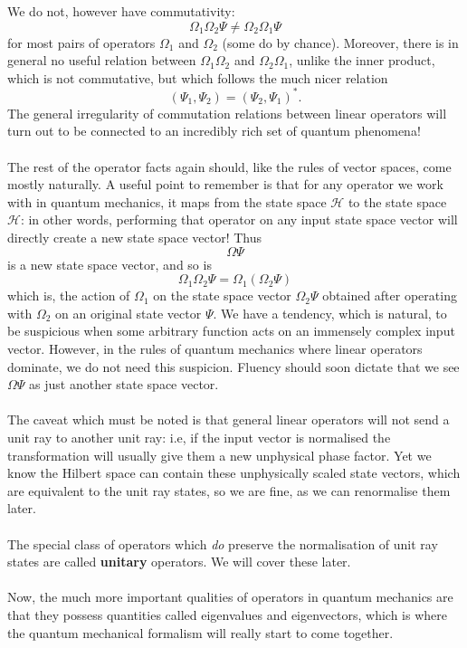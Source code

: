 We do not, however have commutativity:
$$
\Omega_{1}\Omega_{2}\Psi\neq\Omega_{2}\Omega_{1}\Psi
$$
for most pairs of operators $\Omega_{1}$ and $\Omega_{2}$ (some do by chance). Moreover, there is in general no useful relation between $\Omega_{1}\Omega_{2}$ and $\Omega_{2}\Omega_{1}$, unlike the inner product, which is not commutative, but which follows the much nicer relation 
$$
(\Psi_{1},\Psi_{2}) = (\Psi_{2},\Psi_{1})^{\ast}.
$$
The general irregularity of commutation relations between linear operators will turn out to be connected to an incredibly rich set of quantum phenomena!
\\\\
The rest of the operator facts again should, like the rules of vector spaces, come mostly naturally. A useful point to remember is that for any operator we work with in quantum mechanics, it maps from the state space $\mathscr{H}$ to the state space $\mathscr{H}$: in other words, performing that operator on any input state space vector will directly create a new state space vector! Thus 
$$
\Omega\Psi
$$
is a new state space vector, and so is
$$
\Omega_{1}\Omega_{2}\Psi=\Omega_{1}(\Omega_{2}\Psi)
$$
which is, the action of $\Omega_{1}$ on the state space vector $\Omega_{2}\Psi$ obtained after operating with $\Omega_{2}$ on an original state vector $\Psi$. We have a tendency, which is natural, to be suspicious when some arbitrary function acts on an immensely complex input vector. However, in the rules of quantum mechanics where linear operators dominate, we do not need this suspicion. Fluency should soon dictate that we see $\Omega\Psi$ as just another state space vector. 
\\\\
The caveat which must be noted is that general linear operators will not send a unit ray to another unit ray: i.e, if the input vector is normalised the transformation will usually give them a new unphysical phase factor. Yet we know the Hilbert space can contain these unphysically scaled state vectors, which are equivalent to the unit ray states, so we are fine, as we can renormalise them later. 
\\\\
The special class of operators which \textit{do} preserve the normalisation of unit ray states are called \textbf{unitary} operators. We will cover these later.
\\\\
Now, the much more important qualities of operators in quantum mechanics are that they possess quantities called eigenvalues and eigenvectors, which is where the quantum mechanical formalism will really start to come together.
